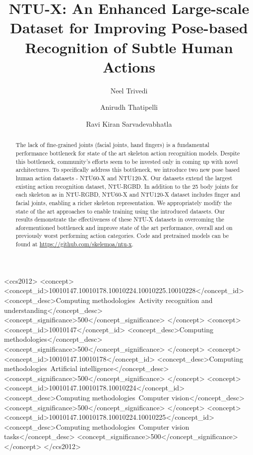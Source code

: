 \documentclass[sigconf,screen,prologue,table,dvipsnames]{acmart}
\begin{document}
\title{NTU-X: An Enhanced Large-scale Dataset for Improving Pose-based Recognition of Subtle Human Actions}


  \author{Neel Trivedi}
  
   \author{Anirudh Thatipelli}
  
   \author{Ravi Kiran Sarvadevabhatla}
  


\renewcommand{\shortauthors}{}


\begin{abstract}
The lack of fine-grained joints (facial joints, hand fingers) is a fundamental performance bottleneck for state of the art skeleton action recognition models. Despite this bottleneck, community's efforts seem to be invested only in coming up with novel architectures. To specifically address this bottleneck, we introduce two new pose based human action datasets - NTU60-X and NTU120-X. Our datasets extend the largest existing action recognition dataset, NTU-RGBD. In addition to the 25 body joints for each skeleton as in NTU-RGBD, NTU60-X and NTU120-X dataset includes finger and facial joints, enabling a richer skeleton representation. We appropriately modify the state of the art approaches to enable training using the introduced datasets. Our results demonstrate the effectiveness of these NTU-X datasets in overcoming the aforementioned bottleneck and improve state of the art performance, overall and on previously worst performing action categories. Code and pretrained
models can be found at \url{https://github.com/skelemoa/ntu-x}.
\end{abstract}

\begin{CCSXML}
<ccs2012>
   <concept>
       <concept_id>10010147.10010178.10010224.10010225.10010228</concept_id>
       <concept_desc>Computing methodologies~Activity recognition and understanding</concept_desc>
       <concept_significance>500</concept_significance>
       </concept>
   <concept>
       <concept_id>10010147</concept_id>
       <concept_desc>Computing methodologies</concept_desc>
       <concept_significance>500</concept_significance>
       </concept>
   <concept>
       <concept_id>10010147.10010178</concept_id>
       <concept_desc>Computing methodologies~Artificial intelligence</concept_desc>
       <concept_significance>500</concept_significance>
       </concept>
   <concept>
       <concept_id>10010147.10010178.10010224</concept_id>
       <concept_desc>Computing methodologies~Computer vision</concept_desc>
       <concept_significance>500</concept_significance>
       </concept>
   <concept>
       <concept_id>10010147.10010178.10010224.10010225</concept_id>
       <concept_desc>Computing methodologies~Computer vision tasks</concept_desc>
       <concept_significance>500</concept_significance>
       </concept>
 </ccs2012>
\end{CCSXML}
\end{document}
